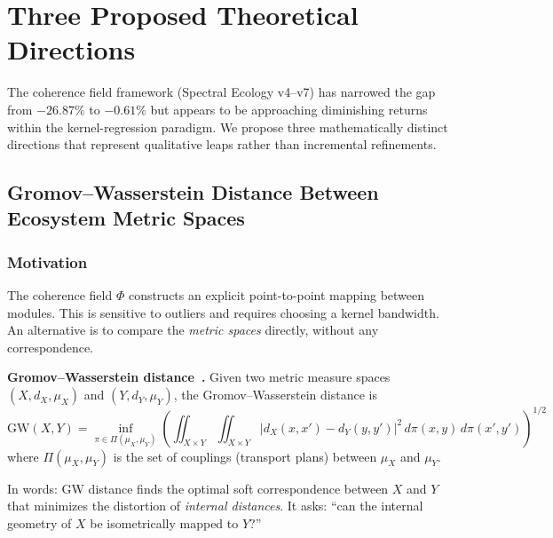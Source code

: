 \documentclass{../yalumba}
\begin{document}
\section{Three Proposed Theoretical Directions}
\label{sec:directions}

The coherence field framework (Spectral Ecology v4--v7) has narrowed
the gap from $-26.87\%$ to $-0.61\%$ but appears to be approaching
diminishing returns within the kernel-regression paradigm.  We propose
three mathematically distinct directions that represent qualitative leaps
rather than incremental refinements.

\subsection{Gromov--Wasserstein Distance Between Ecosystem Metric Spaces}
\label{sec:directions:gw}

\subsubsection{Motivation}

The coherence field $\Phi$ constructs an explicit point-to-point mapping
between modules.  This is sensitive to outliers and requires choosing a
kernel bandwidth.  An alternative is to compare the \emph{metric spaces}
directly, without any correspondence.

\begin{definition}
\textbf{Gromov--Wasserstein distance~\cite{memoli2011gromov}.}  Given two
metric measure spaces $(X, d_X, \mu_X)$ and $(Y, d_Y, \mu_Y)$, the
Gromov--Wasserstein distance is
\begin{equation}
  \mathrm{GW}(X, Y) = \inf_{\pi \in \Pi(\mu_X, \mu_Y)}
  \left(
    \iint_{X \times Y} \iint_{X \times Y}
    |d_X(x, x') - d_Y(y, y')|^2 \,
    d\pi(x,y) \, d\pi(x', y')
  \right)^{1/2}
  \label{eq:gw}
\end{equation}
where $\Pi(\mu_X, \mu_Y)$ is the set of couplings (transport plans)
between $\mu_X$ and $\mu_Y$.
\end{definition}

In words: GW distance finds the optimal soft correspondence between $X$
and $Y$ that minimizes the distortion of \emph{internal distances}.  It
asks: ``can the internal geometry of $X$ be isometrically mapped to
$Y$?''
\end{document}
